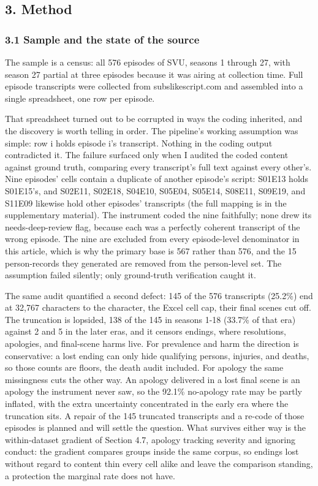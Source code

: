\documentclass[
]{article}
\newcounter{none} %
\begin{document}
\subsection{3. Method}\label{method}

\subsubsection{3.1 Sample and the state of the
source}\label{sample-and-the-state-of-the-source}

The sample is a census: all 576 episodes of SVU, seasons 1 through 27,
with season 27 partial at three episodes because it was airing at
collection time. Full episode transcripts were collected from
subslikescript.com and assembled into a single spreadsheet, one row per
episode.

That spreadsheet turned out to be corrupted in ways the coding
inherited, and the discovery is worth telling in order. The pipeline's
working assumption was simple: row i holds episode i's transcript.
Nothing in the coding output contradicted it. The failure surfaced only
when I audited the coded content against ground truth, comparing every
transcript's full text against every other's. Nine episodes' cells
contain a duplicate of another episode's script: S01E13 holds S01E15's,
and S02E11, S02E18, S04E10, S05E04, S05E14, S08E11, S09E19, and S11E09
likewise hold other episodes' transcripts (the full mapping is in the
supplementary material). The instrument coded the nine faithfully; none
drew its needs-deep-review flag, because each was a perfectly coherent
transcript of the wrong episode. The nine are excluded from every
episode-level denominator in this article, which is why the primary base
is 567 rather than 576, and the 15 person-records they generated are
removed from the person-level set. The assumption failed silently; only
ground-truth verification caught it.

The same audit quantified a second defect: 145 of the 576 transcripts
(25.2\%) end at 32,767 characters to the character, the Excel cell cap,
their final scenes cut off. The truncation is lopsided, 138 of the 145
in seasons 1-18 (33.7\% of that era) against 2 and 5 in the later eras,
and it censors endings, where resolutions, apologies, and final-scene
harms live. For prevalence and harm the direction is conservative: a
lost ending can only hide qualifying persons, injuries, and deaths, so
those counts are floors, the death audit included. For apology the same
missingness cuts the other way. An apology delivered in a lost final
scene is an apology the instrument never saw, so the 92.1\% no-apology
rate may be partly inflated, with the extra uncertainty concentrated in
the early era where the truncation sits. A repair of the 145 truncated
transcripts and a re-code of those episodes is planned and will settle
the question. What survives either way is the within-dataset gradient of
Section 4.7, apology tracking severity and ignoring conduct: the
gradient compares groups inside the same corpus, so endings lost without
regard to content thin every cell alike and leave the comparison
standing, a protection the marginal rate does not have.
\end{document}
